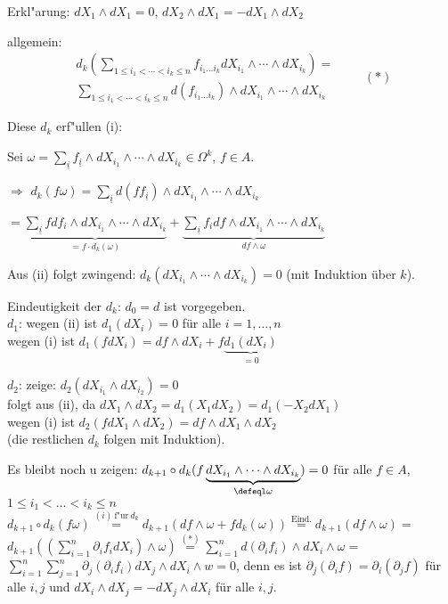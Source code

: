 \begin{SatzDef}
\begin{Bew}
Erkl"arung: $dX_1 \wedge dX_1 = 0$, $dX_2 \wedge dX_1 = - dX_1 \wedge dX_2$

allgemein:
\begin{equation*}
\begin{split}
 d_k(\displaystyle\sum_{1 \leq i_1 < \cdots < i_k \leq n} f_{i_1 \ldots i_k}
dX_{i_1} \wedge \cdots \wedge dX_{i_k}) =\\
\sum_{1 \leq i_1 < \cdots < i_k \leq n} d(f_{i_1 \ldots i_k}) \wedge dX_{i_1}
\wedge \cdots \wedge dX_{i_k} 
\end{split}
\qquad (\ast)
\end{equation*}

Diese $d_k$ erf"ullen (i):

Sei $\omega = \sum_{\underline{i}} f_{\underline{i}} \wedge dX_{i_1} \wedge \cdots \wedge dX_{i_k} \in \Omega^k$, $f \in A$.

$\Rightarrow$ $d_k(f \omega) = \sum_{\underline{i}} d(f f_{\underline{i}}) \wedge dX_{i_1} \wedge \cdots \wedge dX_{i_k}$

$= \underbrace{ \sum_{\underline{i}} f df_i \wedge dX_{i_1} \wedge \cdots \wedge dX_{i_k} }_{= f \cdot d_k(\omega)} + \underbrace{ \sum_{\underline{i}} f_i df \wedge dX_{i_1} \wedge \cdots \wedge dX_{i_k} }_{d f \wedge \omega}$

Aus (ii) folgt zwingend: $d_k(dX_{i_1}\wedge \cdots \wedge dX_{i_k}) = 0$ (mit 
Induktion \"uber $k$).

Eindeutigkeit der $d_k$: $d_0=d$ ist vorgegeben.\\
$d_1$: wegen (ii) ist $d_1(dX_i)=0$ f\"ur alle $i=1, \ldots, n$\\
wegen (i) ist $d_1(fdX_i)=df\wedge dX_i+f\underbrace{d_1(dX_i)}_{=0}$

$d_2$: zeige: $d_2(dX_{i_1}\wedge dX_{i_2})=0$\\
folgt aus (ii), da $dX_1\wedge dX_2=d_1(X_1 dX_2)=d_1(-X_2dX_1)$\\
wegen (i) ist $d_2(fdX_1\wedge dX_2)=df\wedge dX_1\wedge dX_2$\\
(die restlichen $d_k$ folgen mit Induktion).

Es bleibt noch 	u zeigen: $d_{k+1}\circ d_k(f\underbrace{dX_{i_1}\wedge \cdots
\wedge
dX_{i_k}}_{\defeql \omega})=0$ f\"ur alle $f\in A$, $1\leq i_1<\dots<i_k\leq n$\\
$d_{k+1}\circ d_k(f\omega)
\stackrel{(i)\ \textrm{f"ur}\ d_k}{=}d_{k+1}(df\wedge \omega +fd_k(\omega))
\stackrel{\textrm{Eind.}}{=}d_{k+1}(df\wedge \omega) 
=$\\
$d_{k+1}\left(\left(\sum_{i=1}^{n}\partial_i f_i dX_i\right)\wedge
\omega\right)
\stackrel{(\ast)}{=}\sum_{i=1}^{n}d(\partial_if_i)\wedge dX_i\wedge \omega=$\\
$\sum_{i=1}^n \sum_{j=1}^n \partial_j (\partial_i f_i)dX_j\wedge dX_{i}\wedge w=0$,
denn es ist $\partial_j(\partial_i f) = \partial_i(\partial_j f)$ f\"ur alle $i,j$
und $dX_i\wedge dX_j=-dX_j\wedge dX_i$ f\"ur alle $i,j$.


\end{Bew}
\end{SatzDef}
